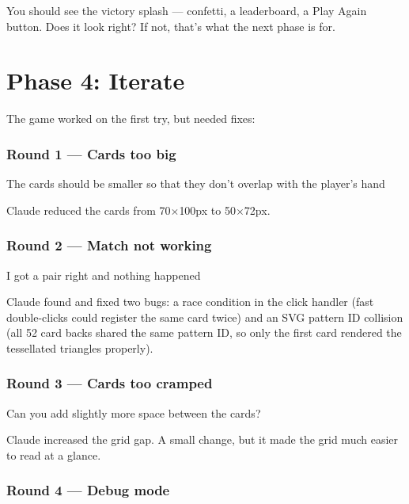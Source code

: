 \documentclass[11pt,a4paper]{article}
\begin{document}
You should see the victory splash --- confetti, a leaderboard, a Play Again button. Does it look right? If not, that's what the next phase is for.

\section{Phase 4: Iterate}

The game worked on the first try, but needed fixes:

\subsubsection{Round 1 --- Cards too big}

\begin{tcolorbox}[promptbox]
The cards should be smaller so that they don't overlap with the player's hand
\end{tcolorbox}

Claude reduced the cards from 70\(\times\)100px to 50\(\times\)72px.

\subsubsection{Round 2 --- Match not working}

\begin{tcolorbox}[promptbox]
I got a pair right and nothing happened
\end{tcolorbox}

Claude found and fixed two bugs: a race condition in the click handler (fast double-clicks could register the same card twice) and an SVG pattern ID collision (all 52 card backs shared the same pattern ID, so only the first card rendered the tessellated triangles properly).

\subsubsection{Round 3 --- Cards too cramped}

\begin{tcolorbox}[promptbox]
Can you add slightly more space between the cards?
\end{tcolorbox}

Claude increased the grid gap. A small change, but it made the grid much easier to read at a glance.

\subsubsection{Round 4 --- Debug mode}
\end{document}
